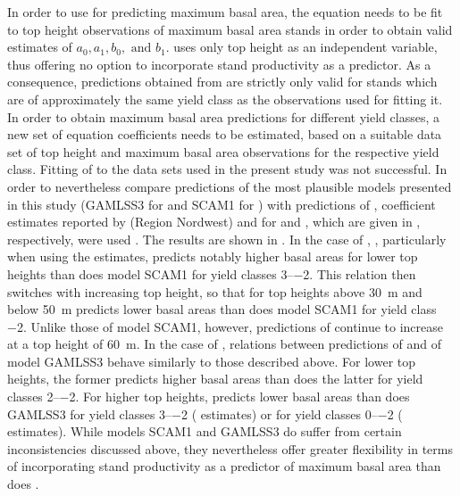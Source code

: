 In order to use  for predicting maximum basal area, the equation needs to be fit to top height observations of maximum basal area stands in order to obtain valid estimates of \(a_0, a_1, b_0, \text{ and } b_1\).    uses only top height as an independent variable, thus offering no option to incorporate stand productivity as a predictor.
As a consequence, predictions obtained from  are strictly only valid for stands which are of approximately the same yield class as the observations used for fitting it.  In order to obtain maximum basal area predictions for different yield classes, a new set of equation coefficients needs to be estimated, based on a suitable data set of top height and maximum basal area observations for the respective yield class.
Fitting of  to the data sets used in the present study was not successful.  In order to nevertheless compare predictions of the most plausible models presented in this study (GAMLSS3 for \Beech{} and SCAM1 for \Spruce{}) with predictions of , coefficient estimates reported by \textcite{Doebbeler2004} (Region Nordwest) and \textcite{Woerdehoff2016} for \Beech{} and \Spruce{}, which are given in , respectively, were used .  The results are shown in .  In the case of \Beech{}, , particularly when using the \textcite{Doebbeler2004} estimates, predicts notably higher basal areas for lower top heights than does model SCAM1 for yield classes \numrange{3}{-2}.  This relation then switches with increasing top height, so that for top heights above \SI{30}{\meter} and below \SI{50}{\meter}  predicts lower basal areas than does model SCAM1 for yield class \num{-2}.  Unlike those of model SCAM1, however, predictions of  continue to increase at a top height of \SI{60}{\meter}.  In the case of \Spruce{}, relations between predictions of  and of model GAMLSS3 behave similarly to those described above.  For lower top heights, the former predicts higher basal areas than does the latter for yield classes \numrange{2}{-2}.  For higher top heights,  predicts lower basal areas than does GAMLSS3 for yield classes \numrange{3}{-2} (\textcite{Woerdehoff2016} estimates) or for yield classes \numrange{0}{-2} (\textcite{Doebbeler2004} estimates).  While models SCAM1 and GAMLSS3 do suffer from certain inconsistencies discussed above, they nevertheless offer greater flexibility in terms of incorporating stand productivity as a predictor of maximum basal area than does .
